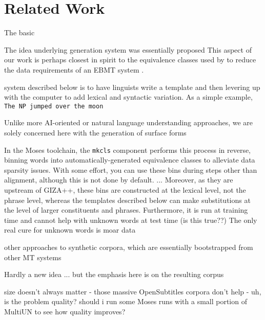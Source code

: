 \section{Related Work}
\label{sec:related}

The basic 

The idea underlying generation system was essentially proposed 
This aspect of our work is perhaps closest in spirit to the equivalence classes used by  to reduce the data requirements of an EBMT system .

system described below is to have linguists write a template and then levering up with the computer to add lexical and syntactic variation.  
As a simple example, 
{\small \tt The NP jumped over the moon}





Unlike more AI-oriented or natural language understanding approaches, we are solely concerned here with the generation of surface forms





In the Moses toolchain, the {\small \tt mkcls} component  performs this process in reverse, binning words into automatically-generated equivalence classes to alleviate data sparsity issues.
With some effort, you can use these bins during steps other than alignment, although this is not done by default.
...
Moreover, as they are upstream of GIZA++, these bins are constructed at the lexical level, not the phrase level, whereas the templates described below can make substitutions at the level of larger constituents and phrases.
Furthermore, it is run at training time and cannot help with unknown words at test time (is this true??)
The only real cure for unknown words is moar data







other approaches to synthetic corpora, which are essentially bootstrapped from other MT systems

Hardly a new idea ... but the emphasis here is on the resulting corpus





size doesn't always matter - those massive OpenSubtitles corpora don't help
- uh, is the problem quality? should i run some Moses runs with a small portion of MultiUN to see how quality improves?

